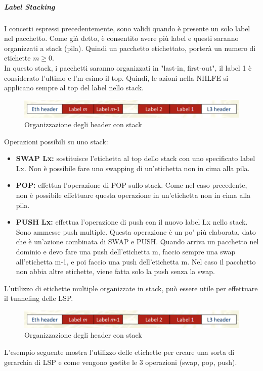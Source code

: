 \documentclass{article}
\begin{document}
\subparagraph{Label Stacking} I concetti espressi precedentemente, sono validi quando è presente un solo label nel pacchetto. Come già detto, è consentito avere più label e questi saranno organizzati a stack (pila). Quindi un pacchetto etichettato, porterà un numero di etichette $m \geq 0$. \\ In questo stack, i pacchetti saranno organizzati in "last-in, first-out", il label 1 è considerato l'ultimo e l'm-esimo il top. Quindi, le azioni nella NHLFE si applicano sempre al top del label nello stack.
\begin{figure}[H]
    \centering
    \includegraphics[scale=0.4]{figures/organizzazione header stack.png}
    \caption{Organizzazione degli header con stack}
\end{figure}
\noindent Operazioni possibili su uno stack:
\begin{itemize}
    \item \textbf{SWAP Lx:} sostituisce l'etichetta al top dello stack con uno specificato label Lx. Non è possibile fare uno swapping di un'etichetta non in cima alla pila.
    \item \textbf{POP:} effettua l'operazione di POP sullo stack. Come nel caso precedente, non è possibile effettuare questa operazione in un'etichetta non in cima alla pila.
    \item \textbf{PUSH Lx:} effettua l'operazione di push con il nuovo label Lx nello stack. Sono ammesse push multiple. Questa operazione è un po' più elaborata, dato che è un'azione combinata di SWAP e PUSH. Quando arriva un pacchetto nel dominio e devo fare una push dell'etichetta m, faccio sempre una swap all'etichetta m-1, e poi faccio una push dell'etichetta m. Nel caso il pacchetto non abbia altre etichette, viene fatta solo la push senza la swap.
\end{itemize}
L'utilizzo di etichette multiple organizzate in stack, può essere utile per effettuare il tunneling delle LSP.
\begin{figure}[H]
    \centering
    \includegraphics[scale=0.4]{figures/organizzazione header stack.png}
    \caption{Organizzazione degli header con stack}
\end{figure}
\noindent L'esempio seguente mostra l'utilizzo delle etichette per creare una sorta di gerarchia di LSP e come vengono gestite le 3 operazioni (swap, pop, push). 
\end{document}
